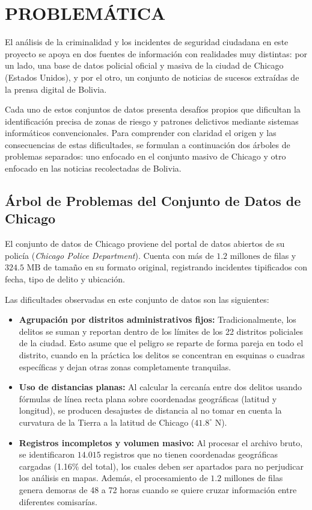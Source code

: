 \section{PROBLEMÁTICA}

El análisis de la criminalidad y los incidentes de seguridad ciudadana en este proyecto se apoya en dos fuentes de información con realidades muy distintas: por un lado, una base de datos policial oficial y masiva de la ciudad de Chicago (Estados Unidos), y por el otro, un conjunto de noticias de sucesos extraídas de la prensa digital de Bolivia. 

Cada uno de estos conjuntos de datos presenta desafíos propios que dificultan la identificación precisa de zonas de riesgo y patrones delictivos mediante sistemas informáticos convencionales. Para comprender con claridad el origen y las consecuencias de estas dificultades, se formulan a continuación dos árboles de problemas separados: uno enfocado en el conjunto masivo de Chicago y otro enfocado en las noticias recolectadas de Bolivia.

\subsection{Árbol de Problemas del Conjunto de Datos de Chicago}

El conjunto de datos de Chicago proviene del portal de datos abiertos de su policía (\textit{Chicago Police Department}). Cuenta con más de $1.2\text{ millones}$ de filas y $324.5\text{ MB}$ de tamaño en su formato original, registrando incidentes tipificados con fecha, tipo de delito y ubicación.

Las dificultades observadas en este conjunto de datos son las siguientes:
\begin{itemize}
    \item \textbf{Agrupación por distritos administrativos fijos:} Tradicionalmente, los delitos se suman y reportan dentro de los límites de los 22 distritos policiales de la ciudad. Esto asume que el peligro se reparte de forma pareja en todo el distrito, cuando en la práctica los delitos se concentran en esquinas o cuadras específicas y dejan otras zonas completamente tranquilas.
    \item \textbf{Uso de distancias planas:} Al calcular la cercanía entre dos delitos usando fórmulas de línea recta plana sobre coordenadas geográficas (latitud y longitud), se producen desajustes de distancia al no tomar en cuenta la curvatura de la Tierra a la latitud de Chicago ($41.8^\circ\text{ N}$).
    \item \textbf{Registros incompletos y volumen masivo:} Al procesar el archivo bruto, se identificaron $14.015$ registros que no tienen coordenadas geográficas cargadas (1.16\% del total), los cuales deben ser apartados para no perjudicar los análisis en mapas. Además, el procesamiento de $1.2\text{ millones}$ de filas genera demoras de 48 a 72 horas cuando se quiere cruzar información entre diferentes comisarías.
\end{itemize}

